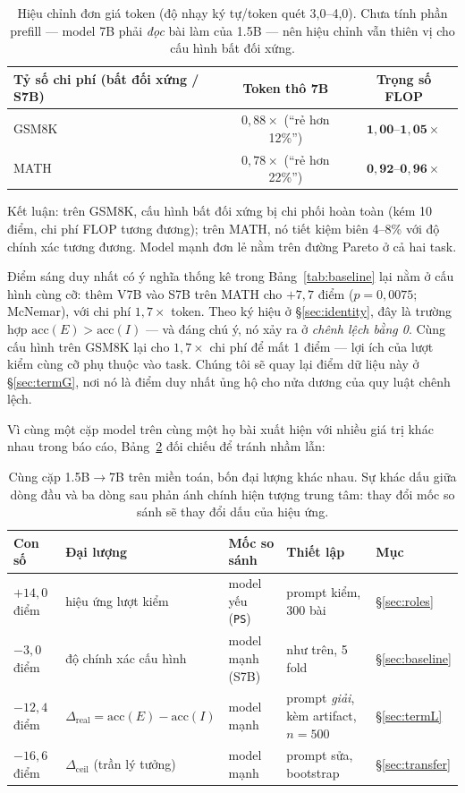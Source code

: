 \documentclass[11pt,a4paper]{article}
\newcommand{\dceil}{\Delta_{\mathrm{ceil}}}
\newcommand{\dhonest}{\Delta_{\mathrm{real}}}
\newcommand{\acc}{\mathrm{acc}}
\begin{document}
\begin{table}[h]\centering\small
\begin{tabular}{@{}l c c@{}}
\toprule
Tỷ số chi phí (bất đối xứng / S7B) & Token thô 7B & Trọng số FLOP\\
\midrule
GSM8K & $0{,}88\times$ (``rẻ hơn 12\%'') & $\mathbf{1{,}00\text{--}1{,}05\times}$ \\
MATH & $0{,}78\times$ (``rẻ hơn 22\%'') & $\mathbf{0{,}92\text{--}0{,}96\times}$ \\
\bottomrule
\end{tabular}
\caption{Hiệu chỉnh đơn giá token (độ nhạy ký tự/token quét 3,0--4,0). Chưa tính phần prefill --- model 7B phải \emph{đọc} bài làm của 1.5B --- nên hiệu chỉnh vẫn thiên vị cho cấu hình bất đối xứng.}
\label{tab:flop}
\end{table}

Kết luận: trên GSM8K, cấu hình bất đối xứng bị chi phối hoàn toàn (kém 10 điểm, chi phí FLOP tương đương); trên MATH, nó tiết kiệm biên 4--8\% với độ chính xác tương đương. Model mạnh đơn lẻ nằm trên đường Pareto ở cả hai task.

Điểm sáng duy nhất có ý nghĩa thống kê trong Bảng~\ref{tab:baseline} lại nằm ở cấu hình cùng cỡ: thêm V7B vào S7B trên MATH cho $+7{,}7$ điểm ($p=0{,}0075$; McNemar), với chi phí $1{,}7\times$ token. Theo ký hiệu ở \S\ref{sec:identity}, đây là trường hợp $\acc(E) > \acc(I)$ --- và đáng chú ý, nó xảy ra ở \emph{chênh lệch bằng 0}. Cùng cấu hình trên GSM8K lại cho $1{,}7\times$ chi phí để mất 1 điểm --- lợi ích của lượt kiểm cùng cỡ phụ thuộc vào task. Chúng tôi sẽ quay lại điểm dữ liệu này ở \S\ref{sec:termG}, nơi nó là điểm duy nhất ủng hộ cho nửa dương của quy luật chênh lệch.

Vì cùng một cặp model trên cùng một họ bài xuất hiện với nhiều giá trị khác nhau trong báo cáo, Bảng~\ref{tab:doichieu} đối chiếu để tránh nhầm lẫn:

\begin{table}[h]\centering\small
\begin{tabular}{@{}l l l l l@{}}
\toprule
Con số & Đại lượng & Mốc so sánh & Thiết lập & Mục\\
\midrule
$+14{,}0$ điểm & hiệu ứng lượt kiểm & model yếu (\texttt{PS}) & prompt kiểm, 300 bài & \S\ref{sec:roles}\\
$-3{,}0$ điểm & độ chính xác cấu hình & model mạnh (S7B) & như trên, 5 fold & \S\ref{sec:baseline}\\
$-12{,}4$ điểm & $\dhonest = \acc(E)-\acc(I)$ & model mạnh & prompt \emph{giải}, kèm artifact, $n=500$ & \S\ref{sec:termL}\\
$-16{,}6$ điểm & $\dceil$ (trần lý tưởng) & model mạnh & prompt sửa, bootstrap & \S\ref{sec:transfer}\\
\bottomrule
\end{tabular}
\caption{Cùng cặp 1.5B$\to$7B trên miền toán, bốn đại lượng khác nhau. Sự khác dấu giữa dòng đầu và ba dòng sau phản ánh chính hiện tượng trung tâm: thay đổi mốc so sánh sẽ thay đổi dấu của hiệu ứng.}
\label{tab:doichieu}
\end{table}
\end{document}
